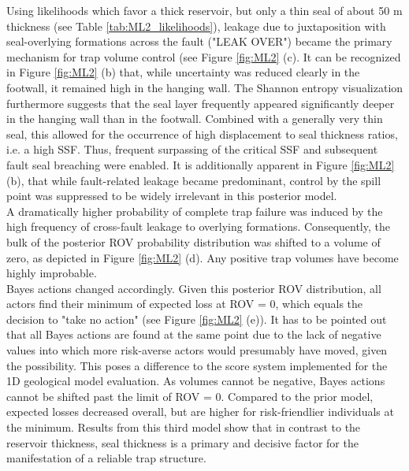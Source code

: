 		Using likelihoods which favor a thick reservoir, but only a thin seal of about 50 m thickness (see Table \ref{tab:ML2_likelihoods}), leakage due to juxtaposition with seal-overlying formations across the fault ("LEAK OVER") became the primary mechanism for trap volume control (see Figure \ref{fig:ML2} (c). It can be recognized in Figure \ref{fig:ML2} (b) that, while uncertainty was reduced clearly in the footwall, it remained high in the hanging wall. The Shannon entropy visualization furthermore suggests that the seal layer frequently appeared significantly deeper in the hanging wall than in the footwall. Combined with a generally very thin seal, this allowed for the occurrence of high displacement to seal thickness ratios, i.e. a high SSF. Thus, frequent surpassing of the critical SSF and subsequent fault seal breaching were enabled. It is additionally apparent in Figure \ref{fig:ML2} (b), that while fault-related leakage became predominant, control by the spill point was suppressed to be widely irrelevant in this posterior model.\\	%
		A dramatically higher probability of complete trap failure was induced by the high frequency of cross-fault leakage to overlying formations. Consequently, the bulk of the posterior ROV probability distribution was shifted to a volume of zero, as depicted in Figure \ref{fig:ML2} (d). Any positive trap volumes have become highly improbable.\\
		Bayes actions changed accordingly. Given this posterior ROV distribution, all actors find their minimum of expected loss at ROV = 0, which equals the decision to "take no action" (see Figure \ref{fig:ML2} (e)). It has to be pointed out that all Bayes actions are found at the same point due to the lack of negative values into which more risk-averse actors would presumably have moved, given the possibility. This poses a difference to the score system implemented for the 1D geological model evaluation. As volumes cannot be negative, Bayes actions cannot be shifted past the limit of ROV = 0. Compared to the prior model, expected losses decreased overall, but are higher for risk-friendlier individuals at the minimum. Results from this third model show that in contrast to the reservoir thickness, seal thickness is a primary and decisive factor for the manifestation of a reliable trap structure.
		
